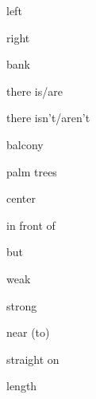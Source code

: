 \documentclass[avery5371,grid,frame]{flashcards}
\begin{document}
\begin{flashcard}{\LARGE left}
\LARGE {}
\end{flashcard}
\begin{flashcard}{\LARGE right}
\LARGE {}
\end{flashcard}
\begin{flashcard}{\LARGE bank}
\LARGE {}
\end{flashcard}
\begin{flashcard}{\LARGE there is/are}
\LARGE {}
\end{flashcard}
\begin{flashcard}{\LARGE there isn't/aren't}
\LARGE {}
\end{flashcard}
\begin{flashcard}{\LARGE balcony}
\LARGE {}
\end{flashcard}
\begin{flashcard}{\LARGE palm trees}
\LARGE {}
\end{flashcard}
\begin{flashcard}{\LARGE center}
\LARGE {}
\end{flashcard}
\begin{flashcard}{\LARGE in front of}
\LARGE {}
\end{flashcard}
\begin{flashcard}{\LARGE but}
\LARGE {}
\end{flashcard}
\begin{flashcard}{\LARGE weak}
\LARGE {}
\end{flashcard}
\begin{flashcard}{\LARGE strong}
\LARGE {}
\end{flashcard}
\begin{flashcard}{\LARGE near (to)}
\LARGE {}
\end{flashcard}
\begin{flashcard}{\LARGE straight on}
\LARGE {}
\end{flashcard}
\begin{flashcard}{\LARGE length}
\LARGE {}
\end{flashcard}
\end{document}

